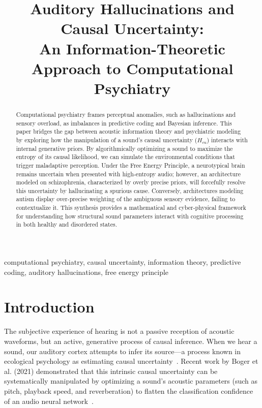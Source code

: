 \documentclass[conference]{IEEEtran}
\begin{document}
\title{Auditory Hallucinations and Causal Uncertainty: \\ An Information-Theoretic Approach to Computational Psychiatry}

\author{
}

\maketitle

\begin{abstract}
Computational psychiatry frames perceptual anomalies, such as hallucinations and sensory overload, as imbalances in predictive coding and Bayesian inference. This paper bridges the gap between acoustic information theory and psychiatric modeling by exploring how the manipulation of a sound's causal uncertainty ($H_{cu}$) interacts with internal generative priors. By algorithmically optimizing a sound to maximize the entropy of its causal likelihood, we can simulate the environmental conditions that trigger maladaptive perception. Under the Free Energy Principle, a neurotypical brain remains uncertain when presented with high-entropy audio; however, an architecture modeled on schizophrenia, characterized by overly precise priors, will forcefully resolve this uncertainty by hallucinating a spurious cause. Conversely, architectures modeling autism display over-precise weighting of the ambiguous sensory evidence, failing to contextualize it. This synthesis provides a mathematical and cyber-physical framework for understanding how structural sound parameters interact with cognitive processing in both healthy and disordered states.
\end{abstract}

\begin{IEEEkeywords}
computational psychiatry, causal uncertainty, information theory, predictive coding, auditory hallucinations, free energy principle
\end{IEEEkeywords}

\section{Introduction}

The subjective experience of hearing is not a passive reception of acoustic waveforms, but an active, generative process of causal inference. When we hear a sound, our auditory cortex attempts to infer its source---a process known in ecological psychology as estimating causal uncertainty~\cite{b1}. Recent work by Boger et al. (2021) demonstrated that this intrinsic causal uncertainty can be systematically manipulated by optimizing a sound's acoustic parameters (such as pitch, playback speed, and reverberation) to flatten the classification confidence of an audio neural network~\cite{b1}.
\end{document}
